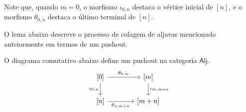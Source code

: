 Note que, quando $m=0$, o morfismo $\iota_{0,n}$ destaca o vértice inicial de $[n]$, e o morfismo $\theta_{0,n}$ destaca o último terminal de $[n]$.

O lema abaixo descreve o processo de colagem de aljavas mencionado anteiormente em termos de um pushout.

\begin{lema}\label{lema:pushout_aljavas_ordinais}
    O diagrama comutativo abaixo define um pushout na categoria $\mathsf{Alj}$.
    \begin{equation}\label{eq:pushout_aljavas_ordinais_diag}
        \begin{tikzcd}[column sep=1.35cm]
            {[0]}
            \arrow[r,"{\theta_{0,m}}"]
            \arrow[d, "{\iota_{0,n}}" swap]
            & {[m]}
            \arrow[d, "{\iota_{m,m+n}}"]
            \\ {[n]}
            \arrow[r, "{\theta_{n,m+n}}" swap]
            & {[m+n]}
        \end{tikzcd}
    \end{equation}
\end{lema}

